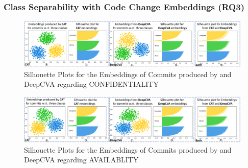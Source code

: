 \subsubsection{\bf Class Separability with Code Change Embeddings (RQ3)}
\label{sec:separation}


\begin{figure}[t]
	\centering
	\includegraphics[width=6.9in]{graphs/confidentiality}
        \vspace{-6pt}
	\caption{Silhouette Plots for the Embeddings of Commits produced by {\tool} and DeepCVA regarding CONFIDENTIALITY}
	\label{fig:confidentiality}
\end{figure}


\begin{figure}[t]
	\centering
	\includegraphics[width=6.9in]{graphs/availability}
       \vspace{-6pt}
	\caption{Silhouette Plots for the Embeddings of Commits produced by {\tool} and DeepCVA regarding AVAILABLITY}
	\label{fig:availability}
\end{figure}

%

